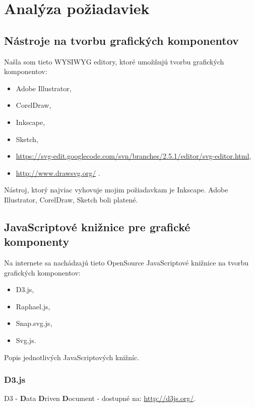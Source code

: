 \chapter{Analýza požiadaviek}

\section{Nástroje na tvorbu grafických komponentov}

Našla som tieto \acs{WYSIWYG} editory, ktoré umožňujú tvorbu grafických komponentov: 

\begin{itemize}
\item Adobe Illustrator, 
\item CorelDraw, 
\item Inkscape,
\item Sketch,
\item \url{https://svg-edit.googlecode.com/svn/branches/2.5.1/editor/svg-editor.html}, 
\item \url{http://www.drawsvg.org/} .
\end{itemize}

Nástroj, ktorý najviac vyhovuje mojim požiadavkam je Inkscape. 
Adobe Illustrator, CorelDraw, Sketch boli platené. 



\section{JavaScriptové knižnice pre grafické komponenty}
Na internete sa nachádzajú tieto OpenSource JavaScriptové knižnice na tvorbu grafických komponentov: 
\begin{itemize}
	\item \acs{D3}.js, 
	\item Raphael.js, 
	\item Snap.svg.js,  
	\item Svg.js. 
\end{itemize}



Popis jednotlivých JavaScriptových knižníc.



\subsection{D3.js}
D3  - \textbf{D}ata \textbf{D}riven \textbf{D}ocument -  dostupné na: \url{http://d3js.org/}.

